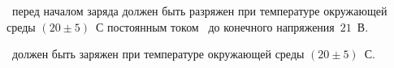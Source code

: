 \dut \ перед началом заряда должен быть разряжен при температуре окружающей среды $(20 \pm 5)$~\degree С постоянным током \current \ до конечного напряжения~$21$~В.

\dut \ должен быть заряжен при температуре окружающей среды $(20 \pm 5)$~\degree С.